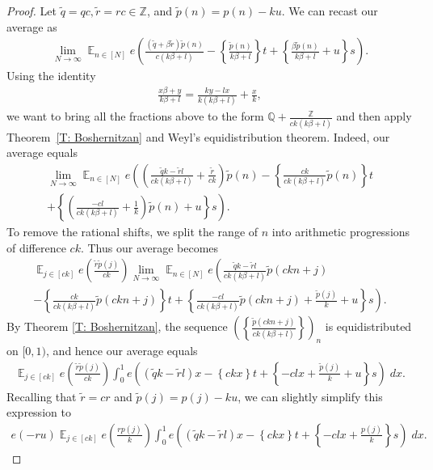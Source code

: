 \documentclass[11pt]{amsart}
\theoremstyle{definition}
\DeclareMathOperator*{\E}{\mathbb{E}}
\newcommand{\Q}{{\mathbb Q}}
\newcommand{\Z}{{\mathbb Z}}
\newcommand{\1}{{\mathbf{1}}}
\newcommand{\brac}[1]{\mathopen{}\left( #1 \mathclose{}\right)}
\newcommand{\rem}[1]{\left \{ #1 \right \}}
\begin{document}
\begin{proof}

Let $\tilde{q} = qc, \tilde{r} = rc\in\Z$, and $\tilde{p}(n) = p(n)-ku$. We can recast our average as
\begin{align*}
    \lim_{N\to\infty}\E_{n\in[N]} e\brac{{\frac{(\tilde{q} +\beta\tilde{r})\tilde{p}(n)}{c(k\beta + l)}}-\rem{\frac{\tilde{p}(n)}{k\beta + l}}t +\rem{\frac{\beta \tilde{p}(n)}{k\beta + l}+u}s}.
\end{align*}
Using the identity
\begin{align*}
    \frac{x\beta + y}{k\beta + l} = \frac{ky - lx}{k(k\beta + l)} + \frac{x}{k},
\end{align*}
we want to bring all the fractions above to the form $\Q + \frac{\Z}{ck(k\beta + l)}$ and then apply Theorem~\ref{T: Boshernitzan} and Weyl's equidistribution theorem. Indeed, our average equals
\begin{multline*}
    \lim_{N\to\infty}\E_{n\in[N]} e\left({\brac{\frac{\tilde{q}k -\tilde{r}l}{ck(k\beta + l)}+\frac{\tilde{r}}{ck}}\tilde{p}(n)}-\rem{\frac{ck}{ck(k\beta + l)}\tilde{p}(n)}t\right.\\
    \left.+\rem{\brac{\frac{-cl}{ck(k\beta + l)}+\frac{1}{k}} \tilde{p}(n)+u}s\right).
\end{multline*}
To remove the rational shifts, we split the range of $n$ into arithmetic progressions of difference $ck$. Thus our average becomes
\begin{multline*}
    \E_{j\in[ck]} e\brac{\frac{\tilde{r}\tilde p(j)}{ck}}  \lim_{N\to\infty}\E_{n\in[N]}e\left({{\frac{\tilde{q}k -\tilde{r}l}{ck(k\beta + l)}}\tilde p(ckn + j)}\right.\\
    \left. -\rem{\frac{ck}{ck(k\beta + l)}\tilde p(ckn+j)}t+\rem{{\frac{-cl}{ck(k\beta + l)}} \tilde p(ckn+j)+\frac{\tilde p(j)}{k}+u}s\right).
\end{multline*}
By Theorem \ref{T: Boshernitzan}, the sequence $\brac{\rem{\frac{\tilde p(ckn+j)}{ck(k\beta + l)}}}_n$ is equidistributed on $[0,1)$, and hence our average  equals
\begin{align*}
    \E_{j\in[ck]}e\left(\frac{\tilde{r}\tilde p(j)}{ck}\right)\int_0^1 e\brac{(\tilde{q}k - \tilde{r}l)x  - \rem{ck x}t + \rem{-clx +\frac{\tilde p(j)}{k}+u}s}\; dx.
\end{align*}
Recalling that $\tilde{r} = cr$ and $\tilde{p}(j) = p(j) - ku$, we can slightly simplify this expression to
\begin{align*}
    e(-ru)\E_{j\in[ck]}e\left(\frac{{r}p(j)}{k}\right)\int_0^1 e\brac{(\tilde{q}k - \tilde{r}l)x  - \rem{ck x}t + \rem{-clx +\frac{ p(j)}{k}}s}\; dx.
\end{align*}


\end{proof}
\end{document}
